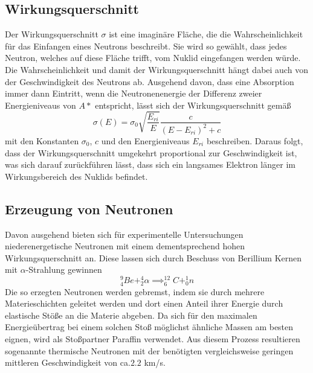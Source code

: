 \subsection{Wirkungsquerschnitt}
Der Wirkungsquerschnitt  $\sigma$ ist eine imaginäre Fläche, die die Wahrscheinlichkeit für das 
Einfangen eines Neutrons beschreibt. Sie wird so gewählt, dass jedes Neutron, welches auf diese 
Fläche trifft, vom Nuklid eingefangen werden würde.
Die Wahrscheinlichkeit und damit der Wirkungsquerschnitt hängt dabei auch von der Geschwindigkeit des 
Neutrons ab. Ausgehend davon, dass eine Absorption immer dann Eintritt, wenn die Neutronenenergie der 
Differenz zweier Energieniveaus von $A*$ entspricht, lässt sich der Wirkungsquerschnitt gemäß
\begin{equation*}
\sigma(E)=\sigma_0 \sqrt{\frac{E_{ri}}{E}}\frac{c}{(E-E_{ri})^2+c}
\end{equation*}
mit den Konstanten $\sigma_0$, $c$ und den Energieniveaus $E_{ri}$ beschreiben. Daraus folgt, dass der
 Wirkungsquerschnitt umgekehrt proportional zur Geschwindigkeit ist, was sich darauf zurückführen lässt, 
 dass sich ein langsames Elektron länger im Wirkungsbereich des Nuklids befindet.
\subsection{Erzeugung von Neutronen}
Davon ausgehend bieten sich für experimentelle Untersuchungen niederenergetische Neutronen mit einem 
dementsprechend hohen Wirkungsquerschnitt an. Diese lassen sich durch Beschuss von Berillium Kernen mit 
$\alpha$-Strahlung gewinnen
\begin{equation*}
^9_4Be + ^4_2\alpha \implies ^{12}_6C + ^1_0n
\end{equation*}
Die so erzegten Neutronen werden gebremst, indem sie durch mehrere Materieschichten geleitet werden und 
dort einen Anteil ihrer Energie durch elastische Stöße an die Materie abgeben. Da sich für den maximalen 
Energieübertrag bei einem solchen Stoß möglichst ähnliche Massen am besten eignen, wird als Stoßpartner 
Paraffin verwendet. Aus diesem Prozess resultieren sogenannte thermische Neutronen mit der benötigten 
vergleichsweise geringen mittleren Geschwindigkeit von ca.$2.2$ km/s.
